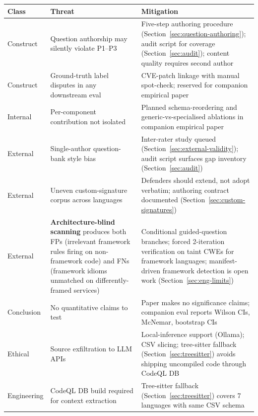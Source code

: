 \documentclass[11pt,a4paper]{article}
\begin{document}
\begin{longtable}{@{}p{} p{} p{}@{}}
\toprule
\textbf{Class} & \textbf{Threat} & \textbf{Mitigation} \\
\midrule
\endhead
Construct &
Question authorship may silently violate P1--P3 &
Five-step authoring procedure
(Section~\ref{sec:question-authoring}); audit script for coverage
(Section~\ref{sec:audit}); content quality requires second author \\
\addlinespace
Construct &
Ground-truth label disputes in any downstream eval &
CVE-patch linkage with manual spot-check; reserved for companion
empirical paper \\
\addlinespace
Internal &
Per-component contribution not isolated &
Planned schema-reordering and generic-vs-specialised ablations in
companion empirical paper \\
\addlinespace
External &
Single-author question-bank style bias &
Inter-rater study queued
(Section~\ref{sec:external-validity}); audit script surfaces gap
inventory (Section~\ref{sec:audit}) \\
\addlinespace
External &
Uneven custom-signature corpus across languages &
Defenders should extend, not adopt verbatim; authoring contract
documented (Section~\ref{sec:custom-signatures}) \\
\addlinespace
External &
\textbf{Architecture-blind scanning} produces both FPs
(irrelevant framework rules firing on non-framework code) and FNs
(framework idioms unmatched on differently-framed services) &
Conditional guided-question branches; forced 2-iteration verification
on taint CWEs for framework languages; manifest-driven framework
detection is open work (Section~\ref{sec:eng-limits}) \\
\addlinespace
Conclusion &
No quantitative claims to test &
Paper makes no significance claims; companion eval reports Wilson CIs,
McNemar, bootstrap CIs \\
\addlinespace
Ethical &
Source exfiltration to LLM APIs &
Local-inference support (Ollama); CSV slicing; tree-sitter fallback
(Section~\ref{sec:treesitter}) avoids shipping uncompiled code through
CodeQL DB \\
\addlinespace
Engineering &
CodeQL DB build required for context extraction &
Tree-sitter fallback (Section~\ref{sec:treesitter}) covers 7 languages
with same CSV schema \\
\bottomrule
\end{longtable}
\end{document}
